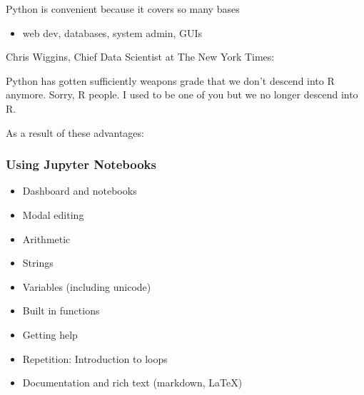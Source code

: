 \documentclass[
    xcolor={svgnames},
    hyperref={colorlinks, citecolor=DeepPink4, linkcolor=DarkRed, urlcolor=DarkBlue}
    ]{beamer}  %
\newcommand{\1}{\mathbbm 1}
\begin{document}
\begin{frame}
    
    Python is convenient because it covers so many bases

            \vspace{0.5em}
            \vspace{0.5em}
    \begin{itemize}
        \item web dev, databases, system admin, GUIs
    \end{itemize}

            \vspace{0.5em}
            \vspace{0.5em}

    Chris Wiggins, Chief Data Scientist at The New York Times:

            \vspace{0.5em}
    \begin{center}
        Python has gotten sufficiently weapons grade that we don't descend into R anymore. Sorry, R people. I used to be one of you but we no longer descend into R.
    \end{center}


\end{frame}


\begin{frame}
    

    As a result of these advantages:

    \begin{figure}
       \begin{center}
       \end{center}
    \end{figure}


\end{frame}





\begin{frame}
    \frametitle{Using Jupyter Notebooks}

    \begin{itemize}
        \item Dashboard and notebooks
        \item Modal editing
        \item Arithmetic
        \item Strings
        \item Variables (including unicode)
        \item Built in functions
        \item Getting help
        \item Repetition: Introduction to loops
        \item Documentation and rich text (markdown, LaTeX)
    \end{itemize}

\end{frame}
\end{document}
